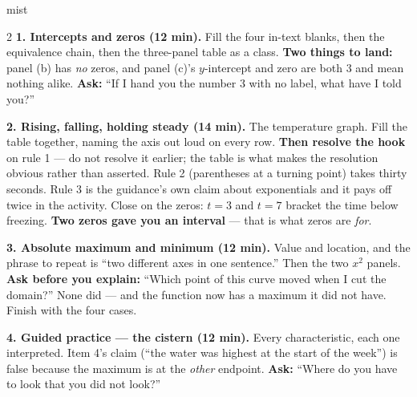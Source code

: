 \documentclass[10pt]{article}
\begin{document}
\boxguard
\begin{skillbox}[Lesson]{mist}
\begin{multicols}{2}
\textbf{1. Intercepts and zeros (12 min).} Fill the four in-text blanks, then the equivalence chain,
then the three-panel table as a class. \textbf{Two things to land:} panel (b) has \emph{no} zeros,
and panel (c)'s $y$-intercept and zero are both $3$ and mean nothing alike. \textbf{Ask:} ``If I hand
you the number $3$ with no label, what have I told you?''

\textbf{2. Rising, falling, holding steady (14 min).} The temperature graph. Fill the table together,
naming the axis out loud on every row. \textbf{Then resolve the hook} on rule 1 --- do not resolve it
earlier; the table is what makes the resolution obvious rather than asserted. Rule 2 (parentheses at
a turning point) takes thirty seconds. Rule 3 is the guidance's own claim about exponentials and it
pays off twice in the activity. Close on the zeros: $t=3$ and $t=7$ bracket the time below freezing.
\textbf{Two zeros gave you an interval} --- that is what zeros are \emph{for}.

\textbf{3. Absolute maximum and minimum (12 min).} Value and location, and the phrase to repeat is
``two different axes in one sentence.'' Then the two $x^2$ panels. \textbf{Ask before you explain:}
``Which point of this curve moved when I cut the domain?'' None did --- and the function now has a
maximum it did not have. Finish with the four cases.

\textbf{4. Guided practice --- the cistern (12 min).} Every characteristic, each one interpreted.
Item 4's claim (``the water was highest at the start of the week'') is false because the maximum is
at the \emph{other} endpoint. \textbf{Ask:} ``Where do you have to look that you did not look?''
\end{multicols}
\end{skillbox}
\end{document}

